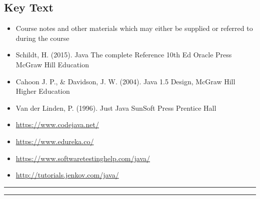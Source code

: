 \subsection*{Key Text}
\begin{itemize}
    \item Course notes and other materials which may either be supplied or referred to during the course
    \item Schildt, H. (2015). Java The complete Reference 10th Ed Oracle Press McGraw Hill Education
    \item Cahoon J. P., & Davidson, J. W. (2004). Java 1.5 Design, McGraw Hill Higher Education
    \item Van der Linden, P. (1996). Just Java SunSoft Press Prentice Hall
    \item \href{https://www.codejava.net/}{https://www.codejava.net/}
    \item \href{https://www.edureka.co/}{https://www.edureka.co/}
    \item \href{https://www.softwaretestinghelp.com/java/}{https://www.softwaretestinghelp.com/java/}
    \item \href{http://tutorials.jenkov.com/java/}{http://tutorials.jenkov.com/java/}
\end{itemize}
\vspace{2ex}\hrule
\vspace{2ex}\hrule\vspace{2ex}